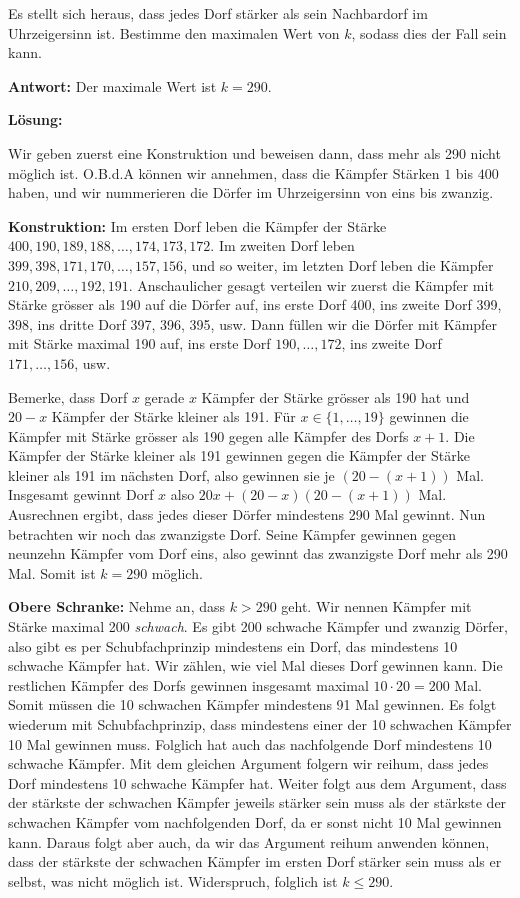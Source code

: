 \documentclass[language=german,style=solution]{smo}
\begin{document}
\begin{enumerate}
Es stellt sich heraus, dass jedes Dorf stärker als sein Nachbardorf im Uhrzeigersinn ist. Bestimme den maximalen Wert von $k$, sodass dies der Fall sein kann.

\textbf{Antwort:} Der maximale Wert ist $k= 290$.

\textbf{Lösung:}

Wir geben zuerst eine Konstruktion und beweisen dann, dass mehr als 290 nicht möglich ist. O.B.d.A können wir annehmen, dass die Kämpfer Stärken $1$ bis $400$ haben, und wir nummerieren die Dörfer im Uhrzeigersinn von eins bis zwanzig.

\textbf{Konstruktion:} Im ersten Dorf leben die Kämpfer der Stärke $400, 190, 189, 188, \ldots, 174,173,172$. Im zweiten Dorf leben $399,398,171,170,\ldots, 157,156$, und so weiter, im letzten Dorf leben die Kämpfer $210, 209, \ldots, 192,191$. Anschaulicher gesagt verteilen wir zuerst die Kämpfer mit Stärke grösser als 190 auf die Dörfer auf, ins erste Dorf 400, ins zweite Dorf 399, 398, ins dritte Dorf 397, 396, 395, usw. Dann füllen wir die Dörfer mit Kämpfer mit Stärke maximal 190 auf, ins erste Dorf $190,\ldots,172$, ins zweite Dorf $171,\ldots, 156$, usw.

Bemerke, dass Dorf $x$ gerade $x$ Kämpfer der Stärke grösser als 190 hat und $20-x$ Kämpfer der Stärke kleiner als 191. Für $x\in \{1,\ldots, 19\}$ gewinnen die Kämpfer mit Stärke grösser als 190 gegen alle Kämpfer des Dorfs $x+1$. Die Kämpfer der Stärke kleiner als 191 gewinnen gegen die Kämpfer der Stärke kleiner als 191 im nächsten Dorf, also gewinnen sie je $(20-(x+1))$ Mal. Insgesamt gewinnt Dorf $x$ also $20x+(20-x)(20-(x+1))$ Mal. Ausrechnen ergibt, dass jedes dieser Dörfer mindestens 290 Mal gewinnt. Nun betrachten wir noch das zwanzigste Dorf. Seine Kämpfer gewinnen gegen neunzehn Kämpfer vom Dorf eins, also gewinnt das zwanzigste Dorf mehr als 290 Mal. Somit ist $k=290$ möglich.

\textbf{Obere Schranke:} Nehme an, dass $k>290$ geht. Wir nennen Kämpfer mit Stärke maximal 200 \textit{schwach}. Es gibt 200 schwache Kämpfer und zwanzig Dörfer, also gibt es per Schubfachprinzip mindestens ein Dorf, das mindestens 10 schwache Kämpfer hat. Wir zählen, wie viel Mal dieses Dorf gewinnen kann. Die restlichen Kämpfer des Dorfs gewinnen insgesamt maximal $10\cdot 20=200$ Mal. Somit müssen die 10 schwachen Kämpfer mindestens 91 Mal gewinnen. Es folgt wiederum mit Schubfachprinzip, dass mindestens einer der 10  schwachen Kämpfer 10 Mal gewinnen muss. Folglich hat auch das nachfolgende Dorf mindestens 10 schwache Kämpfer. Mit dem gleichen Argument folgern wir reihum, dass jedes Dorf mindestens 10 schwache Kämpfer hat. Weiter folgt aus dem Argument, dass der stärkste der schwachen Kämpfer jeweils stärker sein muss als der stärkste der schwachen Kämpfer vom nachfolgenden Dorf, da er sonst nicht 10 Mal gewinnen kann. Daraus folgt aber auch, da wir das Argument reihum anwenden können, dass der stärkste der schwachen Kämpfer im ersten Dorf stärker sein muss als er selbst, was nicht möglich ist. Widerspruch, folglich ist $k\leq 290$.


\end{enumerate}
\end{document}
